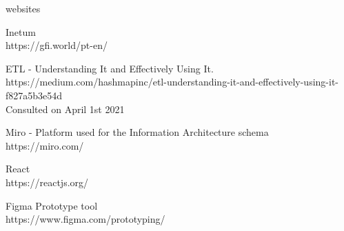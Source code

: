 \documentclass[a4paper,twoside,10pt]{report}
\begin{document}
\begin{thebibliography} {websites}

 Inetum\\ https://gfi.world/pt-en/

 ETL - Understanding It and Effectively Using It.\\
https://medium.com/hashmapinc/etl-understanding-it-and-effectively-using-it-f827a5b3e54d\\
Consulted on April 1st 2021

 Miro - Platform used for the Information Architecture schema\\
https://miro.com/

 React\\ https://reactjs.org/

 Figma Prototype tool\\https://www.figma.com/prototyping/

\end{thebibliography} 
\end{document}
